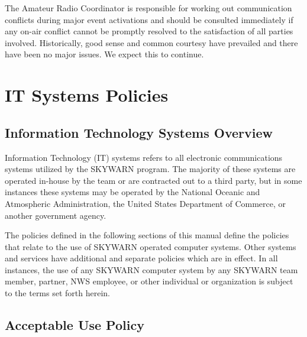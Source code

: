 \documentclass[pdflatex,letterpaper,twoside,12pt]{book}
\begin{document}
The Amateur Radio Coordinator is responsible for working out communication conflicts during major event activations and should be consulted immediately if any on-air conflict cannot be promptly resolved to the satisfaction of all parties involved.  Historically, good sense and common courtesy have prevailed and there have been no major issues.  We expect this to continue.


\chapter{IT Systems Policies}


\section{Information Technology Systems Overview}

Information Technology (IT) systems refers to all electronic communications systems utilized by the SKYWARN program.  The majority of these systems are operated in-house by the team or are contracted out to a third party, but in some instances these systems may be operated by the National Oceanic and Atmospheric Administration, the United States Department of Commerce, or another government agency.

The policies defined in the following sections of this manual define the policies that relate to the use of SKYWARN operated computer systems.  Other systems and services have additional and separate policies which are in effect.  In all instances, the use of any SKYWARN computer system by any SKYWARN team member, partner, NWS employee, or other individual or organization is subject to the terms set forth herein.


\section{Acceptable Use Policy}
\end{document}
